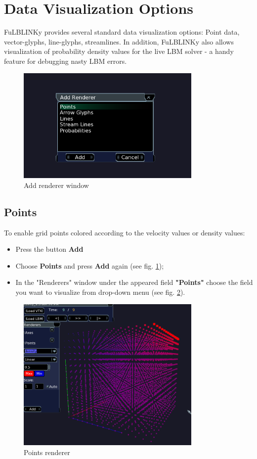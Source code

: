 \documentclass[
12pt, %
a4paper, %
oneside, %
headinclude,footinclude, %
BCOR5mm, %
]{scrartcl}
\begin{document}
\section{Data Visualization Options}
FuLBLINKy provides several standard data visualization options: Point data, vector-glyphs, line-glyphs, streamlines. In addition, FuLBLINKy also allows visualization of probability density values for the live LBM solver - a handy feature for debugging nasty LBM errors. 
\begin{figure}
 \includegraphics[width=0.8\textwidth]{addrenderer.png}
   \caption{Add renderer window}
   \label{fig:addrenderer}
\end{figure}

\subsection{Points}
To enable grid points colored according to the velocity values or density values:
\begin{itemize}
\item Press the button \textbf{Add}
\item Choose \textbf{Points} and press \textbf{Add} again (see fig. \ref{fig:addrenderer});
\item In the "Renderers" window under the appeared field \textbf{"Points"} choose the field you want to visualize from drop-down menu (see fig. \ref{fig:points}).
\end{itemize}
\begin{figure}
 \includegraphics[width=0.8\textwidth]{density_points.png}
   \caption{Points renderer}
   \label{fig:points}
\end{figure}
\end{document}
